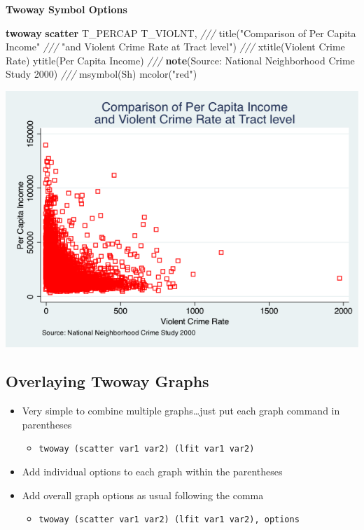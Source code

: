 \documentclass[
]{book}
\newenvironment{Shaded}{\begin{snugshade}}{\end{snugshade}}
\newcommand{\BaseNTok}[1]{\textcolor[rgb]{0.00,0.00,0.81}{#1}}
\newcommand{\CommentTok}[1]{\textcolor[rgb]{0.56,0.35,0.01}{\textit{#1}}}
\newcommand{\KeywordTok}[1]{\textcolor[rgb]{0.13,0.29,0.53}{\textbf{#1}}}
\newcommand{\NormalTok}[1]{#1}
\newcommand{\StringTok}[1]{\textcolor[rgb]{0.31,0.60,0.02}{#1}}
\providecommand{\tightlist}{%
  \setlength{\itemsep}{0pt}\setlength{\parskip}{0pt}}
\begin{document}
\textbf{Twoway Symbol Options}

\begin{Shaded}
\begin{Highlighting}[]
  \KeywordTok{twoway} \KeywordTok{scatter}\NormalTok{ T_PERCAP T_VIOLNT, }\CommentTok{///}
      \BaseNTok{title}\NormalTok{(}\StringTok{"Comparison of Per Capita Income"} \CommentTok{///}
  \StringTok{"and Violent Crime Rate at Tract level"}\NormalTok{) }\CommentTok{///}
  \BaseNTok{xtitle}\NormalTok{(Violent Crime Rate) }\BaseNTok{ytitle}\NormalTok{(Per Capita Income) }\CommentTok{///}
  \KeywordTok{note}\NormalTok{(Source: National Neighborhood Crime Study 2000) }\CommentTok{///}
  \BaseNTok{msymbol}\NormalTok{(Sh) mcolor(}\StringTok{"red"}\NormalTok{)}
\end{Highlighting}
\end{Shaded}

\includegraphics{Stata/StataModGraph/images/msymbol_mcolor.png}

\hypertarget{overlaying-twoway-graphs}{%
\subsection{Overlaying Twoway Graphs}\label{overlaying-twoway-graphs}}

\begin{itemize}
\tightlist
\item
  Very simple to combine multiple graphs\ldots just put each graph command in parentheses

  \begin{itemize}
  \tightlist
  \item
    \texttt{twoway\ (scatter\ var1\ var2)\ (lfit\ var1\ var2)}
  \end{itemize}
\item
  Add individual options to each graph within the parentheses
\item
  Add overall graph options as usual following the comma

  \begin{itemize}
  \tightlist
  \item
    \texttt{twoway\ (scatter\ var1\ var2)\ (lfit\ var1\ var2),\ options}
  \end{itemize}
\end{itemize}
\end{document}
